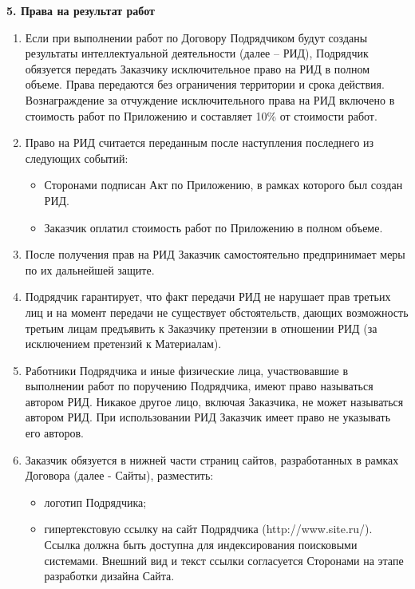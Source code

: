 \documentclass[a4paper, fontsize=12bp]{article}
\newcounter{enum}
\begin{document}
\begin{center}
\textbf{5. Права на результат работ}
\end{center}
\begin{enumerate}[label=\arabic{enum}.\arabic*.]
\item Если при выполнении работ по Договору Подрядчиком будут созданы результаты интеллектуальной деятельности (далее – РИД), Подрядчик обязуется передать Заказчику исключительное право на РИД в полном объеме. Права передаются без ограничения территории и срока действия. Вознаграждение за отчуждение исключительного права на РИД включено в стоимость работ по Приложению и составляет 10\% от стоимости работ.

\item Право на РИД считается переданным после наступления последнего из следующих событий:
\begin{itemize}
	\item Сторонами подписан Акт по Приложению, в рамках которого был создан РИД.
	\item Заказчик оплатил стоимость работ по Приложению в полном объеме.
\end{itemize}

\item После получения прав на РИД Заказчик самостоятельно предпринимает меры по их дальнейшей защите.

\item Подрядчик гарантирует, что факт передачи РИД не нарушает прав третьих лиц и на момент передачи не существует обстоятельств, дающих возможность третьим лицам предъявить к Заказчику претензии в отношении РИД (за исключением претензий к Материалам).

\item Работники Подрядчика и иные физические лица, участвовавшие в выполнении работ по поручению Подрядчика, имеют право называться автором РИД. Никакое другое лицо, включая Заказчика, не может называться автором РИД. При использовании РИД Заказчик имеет право не указывать его авторов.

\item Заказчик обязуется в нижней части страниц сайтов, разработанных в рамках Договора (далее - Сайты), разместить:
\begin{itemize}
	\item логотип Подрядчика;
	\item гипертекстовую ссылку на сайт Подрядчика (http://www.site.ru/). Ссылка должна быть доступна для индексирования поисковыми системами. Внешний вид и текст ссылки согласуется Сторонами на этапе разработки дизайна Сайта.
\end{itemize}


\end{enumerate}
\end{document}

